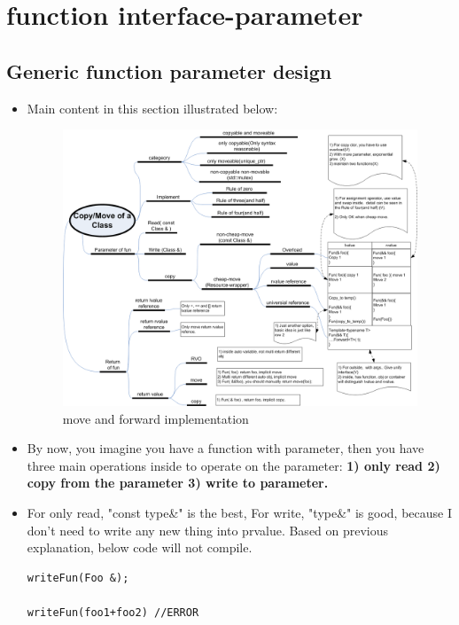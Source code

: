 \documentclass[a4paper,11pt,twoside]{book}
\begin{document}
\section{function interface-parameter}

\subsection{Generic function parameter design}
\begin{itemize}
\item Main content in this section illustrated below: 

	\begin{figure}[h]
	\centering
	\includegraphics[width=1.0\linewidth]{pics/move.png}
	\caption{move and forward implementation}
	\label{fig:rvalueref}
\end{figure}


\item  By now, you imagine you have a function with parameter, then you have three main operations inside to operate on the parameter: \textbf{1) only read 2) copy from the parameter 3) write to parameter.}

\item For only read, "const type\&" is the best, For write, "type\&" is good, because I don't need to write any new thing into prvalue. Based on previous explanation, below code will not compile. 
\begin{lstlisting}[numbers=none]
writeFun(Foo &);

writeFun(foo1+foo2) //ERROR
\end{lstlisting}


\end{itemize}
\end{document}
